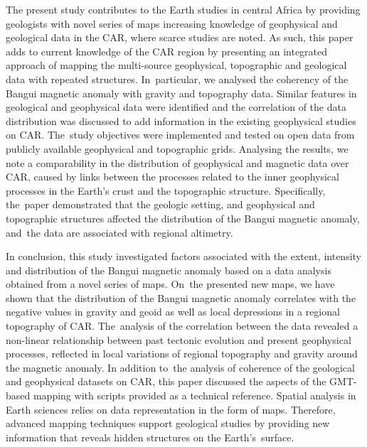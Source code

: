 \documentclass[minerals,article,accept,pdftex,moreauthors]{Definitions/mdpi}
\begin{document}
{The present study contributes to the Earth studies in central Africa by providing geologists with novel series of maps increasing knowledge of geophysical and geological data in the CAR, where scarce studies are noted. As such, }this paper adds to current knowledge of the CAR region by presenting an integrated approach of mapping the multi-source geophysical, topographic and geological data with repeated structures. In~particular, we analysed the coherency of the Bangui magnetic anomaly with gravity and topography data. Similar features in geological and geophysical data were identified and the correlation of the data distribution was discussed to add information in the existing geophysical studies on CAR. The~study objectives were implemented and tested on open data from publicly available geophysical and topographic grids. Analysing the results, we note a comparability in the distribution of geophysical and magnetic data over CAR, caused by links between the processes related to the inner geophysical processes in the Earth's crust and the topographic structure. {Specifically, the~paper demonstrated that the geologic setting, and geophysical and topographic structures affected the distribution of the Bangui magnetic anomaly, and~the data are associated with regional altimetry.}

{In conclusion, this study investigated factors associated with the extent, intensity and distribution of the Bangui magnetic anomaly based on a data analysis obtained from a novel series of maps. On~the presented new maps, }we have shown that the distribution of the Bangui magnetic anomaly correlates with the negative values in gravity and geoid as well as local depressions in a regional topography of CAR. The~analysis of the correlation between the data{ }revealed {a} non-linear relationship between past tectonic evolution and present geophysical processes, reflected in local variations of regional topography and gravity around the magnetic anomaly. In addition to~the analysis of coherence of the geological and geophysical datasets on CAR, this paper discussed the aspects of the GMT-based mapping with scripts provided as a technical reference. Spatial analysis in Earth sciences relies on data representation in the form of maps. Therefore, advanced mapping techniques support geological studies by providing new information that reveals hidden structures on the Earth's~surface. 

\vspace{+6pt}
\end{document}
